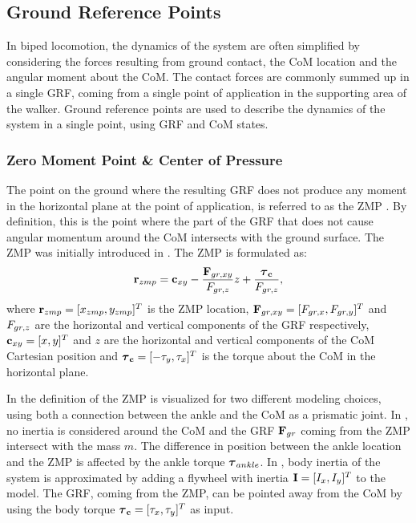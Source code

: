 \subsection{Ground Reference Points}\label{sec:grp}
In biped locomotion, the dynamics of the system are often simplified by considering the forces resulting from ground contact, the \ac{CoM} location and the angular moment about the \ac{CoM}. The contact forces are commonly summed up in a single \ac{GRF}, coming from a single point of application in the supporting area of the walker. Ground reference points are used to describe the dynamics of the system in a single point, using \ac{GRF} and \ac{CoM} states.

\subsubsection{Zero Moment Point \& Center of Pressure} 
The point on the ground where the resulting \ac{GRF} does not produce any moment in the horizontal plane at the point of application, is referred to as the \ac{ZMP} \cite{sardain2004forces}. By definition, this is the point where the part of the \ac{GRF} that does not cause angular momentum around the \ac{CoM} intersects with the ground surface. The \ac{ZMP} was initially introduced in \cite{vukobratovic1969contribution}. The \ac{ZMP} is formulated as:
\begin{equation}
    \mathbf{r}_{zmp}=\mathbf{c}_{xy}-\frac{\mathbf{F}_{gr,xy}}{F_{gr,z}}z+\frac{\boldsymbol{\tau}_{\mathbf{c}}}{F_{gr,z}},
\end{equation}
where $\mathbf{r}_{zmp} = [x_{zmp}, y_{zmp}]^T$ is the \ac{ZMP} location, $\mathbf{F}_{gr,xy}=[F_{gr,x},F_{gr,y}]^T$ and $F_{gr,z}$ are the horizontal and vertical components of the \ac{GRF} respectively, $\mathbf{c}_{xy} = [x,y]^T$ and $z$ are the horizontal and vertical components of the \ac{CoM} Cartesian position and $\boldsymbol{\tau}_{\mathbf{c}} = [-\tau_y,\tau_x]^T$ is the torque about the \ac{CoM} in the horizontal plane. 

In  the definition of the \ac{ZMP} is visualized for two different modeling choices, using both a connection between the ankle and the \ac{CoM} as a prismatic joint. In , no inertia is considered around the \ac{CoM} and the \ac{GRF} $\mathbf{F}_{gr}$ coming from the \ac{ZMP} intersect with the mass $m$. The difference in position between the ankle location and the \ac{ZMP} is affected by the ankle torque $\boldsymbol{\tau}_{ankle}$. In , body inertia of the system is approximated by adding a flywheel with inertia $\mathbf{I} = [I_x, I_y]^T$ to the model. The \ac{GRF}, coming from the \ac{ZMP}, can be pointed away from the \ac{CoM} by using the body torque $\boldsymbol{\tau}_{\mathbf{c}} = [\tau_x, \tau_y]^T$ as input. 

